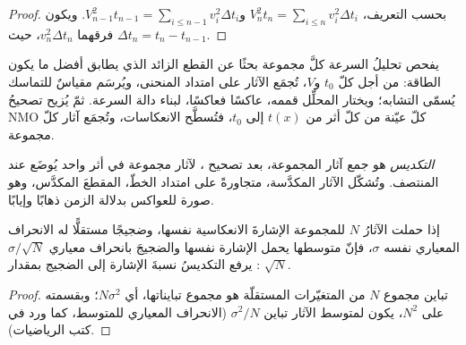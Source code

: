 \begin{proof}
بحسب التعريف، $V_n^2t_n = \sum_{i\le n}v_i^2\Delta t_i$ و$V_{n-1}^2t_{n-1}
= \sum_{i\le n-1}v_i^2\Delta t_i$. ويكون فرقهما $v_n^2\Delta t_n$، حيث
$\Delta t_n = t_n - t_{n-1}$.
\end{proof}

يفحص تحليلُ السرعة كلَّ مجموعة بحثًا عن القطع الزائد الذي يطابق أفضل ما يكون
الطاقة: من أجل كلّ $t_0$ و$V$، تُجمَع الآثار على امتداد المنحنى،
ويُرسَم مقياسٌ للتماسك يُسمّى التشابه؛ ويختار المحلِّل قممه،
عاكسًا فعاكسًا، لبناء دالة السرعة. ثمّ يُزيح تصحيحُ NMO
كلّ عيّنة من كلّ أثر من $t(x)$ إلى $t_0$، فتُسطَّح
الانعكاسات، وتُجمَع آثار كلّ مجموعة.

\begin{definition}[التكديس]\label{def:b3:exploration-seismology:stack}
\emph{التكديس} هو جمع آثار المجموعة، بعد
تصحيح ، لآثار مجموعة  في أثر واحد
يُوضَع عند المنتصف. وتُشكّل الآثار المكدَّسة، متجاورةً على امتداد الخطّ،
المقطعَ المكدَّس، وهو صورة للعواكس بدلالة الزمن ذهابًا وإيابًا.
\end{definition}

\begin{proposition}\label{prop:b3:exploration-seismology:sqrtN}
إذا حملت الآثارُ $N$ للمجموعة الإشارةَ الانعكاسية نفسها، وضجيجًا مستقلًّا
له الانحراف المعياري نفسه $\sigma$، فإنّ متوسطها يحمل الإشارة نفسها
والضجيجَ بانحراف معياري $\sigma/\sqrt N$: يرفع التكديسُ
نسبةَ الإشارة إلى الضجيج بمقدار $\sqrt N$.
\end{proposition}

\begin{proof}
تباين مجموع $N$ من المتغيّرات المستقلّة هو مجموع تبايناتها،
أي $N\sigma^2$؛ وبقسمته على $N^2$، يكون لمتوسط الآثار تباين
$\sigma^2/N$ (الانحراف المعياري للمتوسط، كما ورد في
كتب الرياضيات).
\end{proof}

